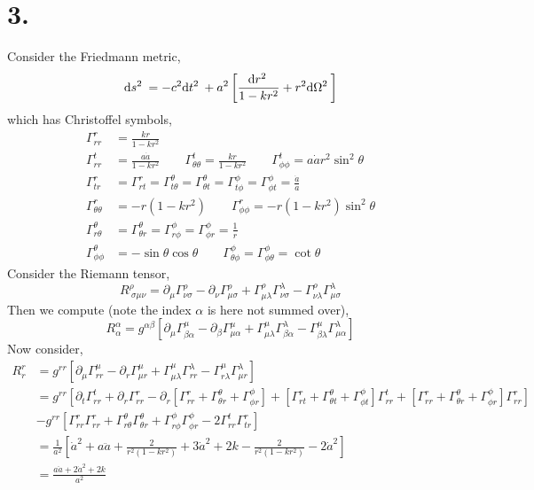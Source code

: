 \documentclass[12pt]{article}
\begin{document}
\section*{3.}

Consider the Friedmann metric, 
\[ \mathrm{d}s^2 \: = - c^2 \mathrm{d}t^2 \: + a^2 \left[ \frac{\mathrm{d}r^2 \:}{1 - k r^2} + r^2 \mathrm{d}\Omega^2 \: \right] \]
which has Christoffel symbols,
\begin{align*}
\Gamma^r_{rr} & = \frac{k r}{1 -k r^2} 
\\
 \Gamma^t_{rr} & = \frac{a \dot{a}}{1 -k r^2} \quad \quad \Gamma^t_{\theta \theta} = \frac{k r}{1 -k r^2}  \quad \quad \Gamma^t_{\phi \phi} = a \dot{a} r^2 \sin^2{\theta} 
\\
\Gamma^r_{tr} & = \Gamma^r_{rt} = \Gamma^\theta_{t \theta} = \Gamma^\theta_{\theta t} = \Gamma^\phi_{t \phi} = \Gamma^\phi_{\phi t} = \frac{\dot{a}}{a}
\\
\Gamma^r_{\theta \theta} & = - r (1 - k r^2) \quad \quad \Gamma^r_{\phi \phi} = - r(1 - k r^2) \sin^2{\theta} 
\\
\Gamma^\theta_{r \theta} & = \Gamma^\theta_{\theta r} = \Gamma^\phi_{r \phi} = \Gamma^\phi_{\phi r} = \frac{1}{r}  
\\
\Gamma^\theta_{\phi \phi} & = - \sin{\theta} \cos{\theta} \quad \quad \Gamma^\phi_{\theta \phi} = \Gamma^{\phi}_{\phi \theta} = \cot{\theta} 
\end{align*}
Consider the Riemann tensor,
\[ R^\rho_{\: \sigma \mu \nu} = \partial_\mu \Gamma^{\rho}_{\nu \sigma} - \partial_\nu \Gamma^\rho_{\mu \sigma} + \Gamma^\rho_{\mu \lambda} \Gamma^\lambda_{\nu \sigma} - \Gamma^\rho_{\nu \lambda} \Gamma^\lambda_{\mu \sigma} \]
Then we compute (note the index $\alpha$ is here not summed over),
\[ R^\alpha_\alpha = g^{\alpha \beta} \left[ \partial_\mu \Gamma^{\mu}_{\beta \alpha} - \partial_\beta \Gamma^\mu_{\mu \alpha} + \Gamma^\mu_{\mu \lambda} \Gamma^\lambda_{\beta \alpha} - \Gamma^\mu_{\beta \lambda} \Gamma^\lambda_{\mu \alpha} \right] \]
Now consider,
\begin{align*}
R^r_r & = g^{rr} \left[ \partial_\mu \Gamma^{\mu}_{rr} - \partial_r \Gamma^\mu_{\mu r} + \Gamma^\mu_{\mu \lambda} \Gamma^\lambda_{rr} - \Gamma^\mu_{r \lambda} \Gamma^\lambda_{\mu r} \right] 
\\
& = g^{rr} \left[ \partial_t \Gamma^{t}_{rr} + \partial_r \Gamma^r_{rr} - \partial_r [\Gamma^r_{r r} + \Gamma^\theta_{\theta r} + \Gamma^\phi_{\phi r}]  + [\Gamma^r_{rt} + \Gamma^\theta_{\theta t} + \Gamma^\phi_{\phi t}]  \Gamma^t_{rr} + [\Gamma^r_{rr} + \Gamma^\theta_{\theta r} + \Gamma^\phi_{\phi r}]  \Gamma^r_{rr}  \right] 
\\
& - g^{rr} \left[ \Gamma^r_{r r} \Gamma^r_{r r} + \Gamma^\theta_{r \theta} \Gamma^\theta_{\theta r} + \Gamma^\phi_{r \phi} \Gamma^\phi_{\phi r} - 2 \Gamma^t_{rr} \Gamma^r_{tr} \right]
\\
& = \frac{1}{a^2} \left[ \dot{a}^2 + a \ddot{a} + \frac{2}{r^2(1 - k r^2)} + 3 \dot{a}^2 + 2k  - \frac{2}{r^2(1 - k r^2)} - 2 \dot{a}^2 \right]
\\
& = \frac{a \ddot{a} + 2 \dot{a}^2 + 2k}{a^2} 
\end{align*}
\end{document}

